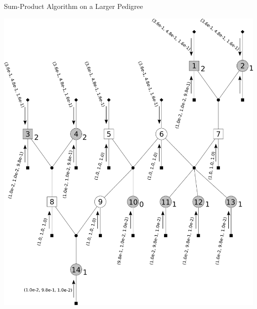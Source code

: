 \documentclass[letter,graphicx]{beamer}
\begin{document}
\begin{frame}{Sum-Product Algorithm on a Larger Pedigree}
\begin{center}
\includegraphics[height = 0.8\textheight]{./images/mg-example-step1.pdf}
\end{center}
\end{frame}
\end{document}
